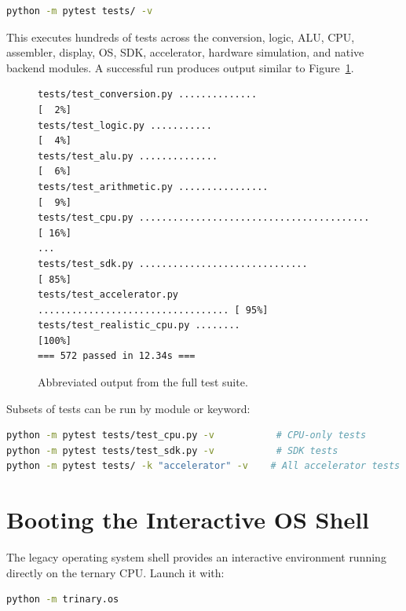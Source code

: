 \begin{lstlisting}[language=bash, caption={Running the full test suite}, label={lst:tests}]
python -m pytest tests/ -v
\end{lstlisting}

This executes hundreds of tests across the conversion, logic, ALU, CPU, assembler, display, OS, SDK, accelerator, hardware simulation, and native backend modules. A successful run produces output similar to Figure~\ref{fig:test-output}.

\begin{figure}[h]
\centering
\begin{lstlisting}[basicstyle=\ttfamily\tiny, caption={Sample test output (abbreviated)}, label={lst:test-output}]
tests/test_conversion.py ..............                       [  2%]
tests/test_logic.py ...........                              [  4%]
tests/test_alu.py ..............                             [  6%]
tests/test_arithmetic.py ................                    [  9%]
tests/test_cpu.py ......................................... [ 16%]
...
tests/test_sdk.py ..............................               [ 85%]
tests/test_accelerator.py .................................. [ 95%]
tests/test_realistic_cpu.py ........                         [100%]
=== 572 passed in 12.34s ===
\end{lstlisting}
\caption{Abbreviated output from the full test suite.}
\label{fig:test-output}
\end{figure}

Subsets of tests can be run by module or keyword:

\begin{lstlisting}[language=bash, caption={Running specific test subsets}, label={lst:test-subsets}]
python -m pytest tests/test_cpu.py -v           # CPU-only tests
python -m pytest tests/test_sdk.py -v           # SDK tests
python -m pytest tests/ -k "accelerator" -v    # All accelerator tests
\end{lstlisting}

\section{Booting the Interactive OS Shell}

The legacy operating system shell provides an interactive environment running directly on the ternary CPU. Launch it with:

\begin{lstlisting}[language=bash, caption={Booting the interactive OS shell}, label={lst:os}]
python -m trinary.os
\end{lstlisting}

